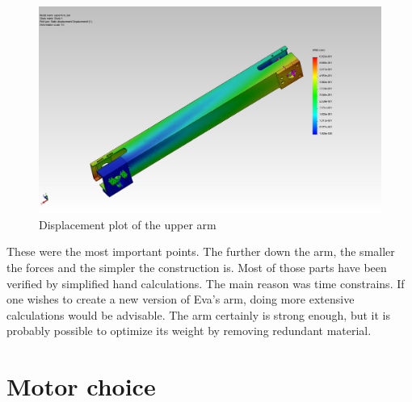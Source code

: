 \documentclass[technical_document.tex]{subfiles}
\begin{document}
\begin{figure}[ht!]
	\centering
	\mbox{\includegraphics[scale=0.3]{Images/upperArm_bar_displace.jpg}}
	\caption{Displacement plot of the upper arm}
	\label{fig:upperArm_displace}
\end{figure}

These were the most important points. The further down the arm, the smaller the forces and the simpler the construction is. Most of those parts have been verified by simplified hand calculations. The main reason was time constrains. If one wishes to create a new version of Eva’s arm, doing more extensive calculations would be advisable. The arm certainly is strong enough, but it is probably possible to optimize its weight by removing redundant material.


\section{Motor choice}


 
\end{document}
